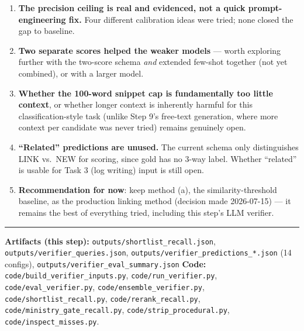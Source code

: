 \documentclass[11pt,a4paper]{article}
\begin{document}
\begin{enumerate}[leftmargin=1.4em]
  \item \textbf{The precision ceiling is real and evidenced, not a quick prompt-engineering
        fix.} Four different calibration ideas were tried; none closed the gap to baseline.
  \item \textbf{Two separate scores helped the weaker models} --- worth exploring further with
        the two-score schema \emph{and} extended few-shot together (not yet combined), or with
        a larger model.
  \item \textbf{Whether the 100-word snippet cap is fundamentally too little context}, or
        whether longer context is inherently harmful for this classification-style task
        (unlike Step 9's free-text generation, where more context per candidate was never
        tried) remains genuinely open.
  \item \textbf{``Related'' predictions are unused.} The current schema only distinguishes
        LINK vs.\ NEW for scoring, since gold has no 3-way label. Whether ``related'' is usable
        for Task 3 (log writing) input is still open.
  \item \textbf{Recommendation for now}: keep method (a), the similarity-threshold baseline,
        as the production linking method (decision made 2026-07-15) --- it remains the best of
        everything tried, including this step's LLM verifier.
\end{enumerate}

\vspace{1.5em}
\hrule
\vspace{0.4em}
\raggedright
{\small
\textbf{Artifacts (this step):} \newline
\texttt{outputs/shortlist\_recall.json}, \texttt{outputs/verifier\_queries.json}, \newline
\texttt{outputs/verifier\_predictions\_*.json} (14 configs), \texttt{outputs/verifier\_eval\_summary.json} \newline
\textbf{Code:} \texttt{code/build\_verifier\_inputs.py}, \texttt{code/run\_verifier.py},
\texttt{code/eval\_verifier.py}, \texttt{code/ensemble\_verifier.py}, \newline
\texttt{code/shortlist\_recall.py}, \texttt{code/rerank\_recall.py},
\texttt{code/ministry\_gate\_recall.py}, \newline \texttt{code/strip\_procedural.py},
\texttt{code/inspect\_misses.py}.
}
\end{document}
